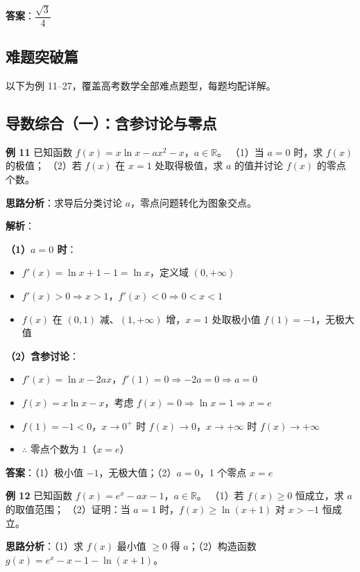 \textbf{答案}：$\dfrac{\sqrt{3}}{4}$

\newpage
\subsection*{难题突破篇}

以下为例 11--27，覆盖高考数学全部难点题型，每题均配详解。

\subsection{导数综合（一）：含参讨论与零点}

\textbf{例 11} 已知函数 $f(x)=x\ln x - ax^2 - x$，$a\in\mathbb{R}$。
（1）当 $a=0$ 时，求 $f(x)$ 的极值；
（2）若 $f(x)$ 在 $x=1$ 处取得极值，求 $a$ 的值并讨论 $f(x)$ 的零点个数。

\textbf{思路分析}：求导后分类讨论 $a$，零点问题转化为图象交点。

\textbf{解析}：

\textbf{（1）$a=0$ 时}：
\begin{itemize}
  \item $f'(x)=\ln x + 1 - 1 = \ln x$，定义域 $(0,+\infty)$
  \item $f'(x)>0 \Rightarrow x>1$，$f'(x)<0 \Rightarrow 0<x<1$
  \item $f(x)$ 在 $(0,1)$ 减、$(1,+\infty)$ 增，$x=1$ 处取极小值 $f(1)=-1$，无极大值
\end{itemize}

\textbf{（2）含参讨论}：
\begin{itemize}
  \item $f'(x)=\ln x - 2ax$，$f'(1)=0 \Rightarrow -2a=0 \Rightarrow a=0$
  \item $f(x)=x\ln x - x$，考虑 $f(x)=0 \Rightarrow \ln x = 1 \Rightarrow x=e$
  \item $f(1)=-1<0$，$x\to0^+$ 时 $f(x)\to0$，$x\to+\infty$ 时 $f(x)\to+\infty$
  \item $\therefore$ 零点个数为 1（$x=e$）
\end{itemize}

\textbf{答案}：（1）极小值 $-1$，无极大值；（2）$a=0$，1 个零点 $x=e$

\textbf{例 12} 已知函数 $f(x)=e^x - ax - 1$，$a\in\mathbb{R}$。
（1）若 $f(x)\ge0$ 恒成立，求 $a$ 的取值范围；
（2）证明：当 $a=1$ 时，$f(x) \ge \ln(x+1)$ 对 $x>-1$ 恒成立。

\textbf{思路分析}：（1）求 $f(x)$ 最小值 $\ge0$ 得 $a$；（2）构造函数 $g(x)=e^x-x-1-\ln(x+1)$。

